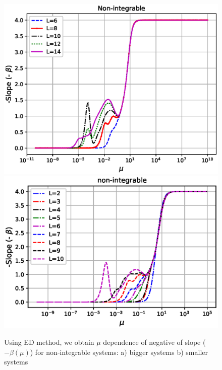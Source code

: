 \documentclass[11pt,a4paper]{article}
\begin{document}
\begin{figure}[!ht]
\begin{center}
\includegraphics[scale=0.43]{new_pics/v3_slope_nonint_semilogx.eps}
\includegraphics[scale=0.52]{new_pics/slope_small_system_nonint.eps}
\caption{Using ED method, we obtain  $\mu$ dependence of negative of slope ($-\beta (\mu)$) for non-integrable systems: a) bigger systems b) smaller systems}
\label{beta_mu_scaling}
\end{center}
\end{figure}
\end{document}
